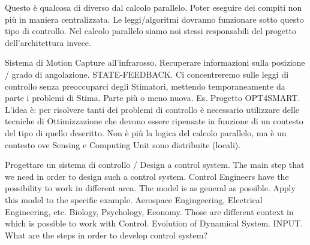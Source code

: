 Questo è qualcosa di diverso dal calcolo parallelo. Poter eseguire dei compiti non più in maniera centralizzata. Le leggi/algoritmi dovranno funzionare sotto questo tipo di controllo. Nel calcolo parallelo siamo noi stessi responsabili del progetto dell'architettura invece.

Sistema di Motion Capture all'infrarosso. Recuperare informazioni sulla posizione / grado di angolazione. STATE-FEEDBACK. Ci concentreremo sulle leggi di controllo senza preoccuparci degli Stimatori, mettendo temporaneamente da parte i problemi di Stima. Parte più o meno nuova. Es. Progetto OPT4SMART. L'idea è: per risolvere tanti dei problemi di controllo è necessario utilizzare delle tecniche di Ottimizzazione che devono essere ripensate in funzione di un contesto del tipo di quello descritto. Non è più la logica del calcolo parallelo, ma è un contesto ove Sensing e Computing Unit sono distribuite (locali).

Progettare un sistema di controllo / Design a control system. The main step that we need in order to design such a control system. Control Engineers have the possibility to work in different area. The model is as general as possible. Apply this model to the specific example. Aerospace Engingeering, Electrical Engineering, etc. Biology, Psychology, Economy. Those are different context in which is possible to work with Control. Evolution of Dynamical System. INPUT. What are the steps in order to develop control system?

